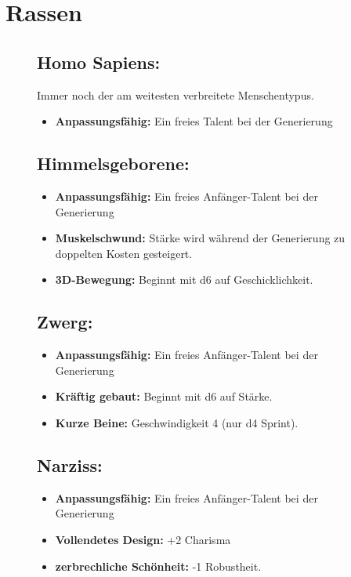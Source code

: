 \documentclass[10pt,a4paper]{report}
\begin{document}
\section{Rassen}
\begin{figure}[h!]
\subsection*{Homo Sapiens:} Immer noch der am weitesten verbreitete Menschentypus.
\begin{itemize}
\item \textbf{Anpassungsfähig:} Ein freies Talent bei der Generierung
\end{itemize}
\end{figure}

\begin{figure}[h!]
\subsection*{Himmelsgeborene:}
\begin{itemize}
\item \textbf{Anpassungsfähig:} Ein freies Anfänger-Talent bei der Generierung
\item \textbf{Muskelschwund:} Stärke wird während der Generierung zu doppelten Kosten gesteigert.
\item \textbf{3D-Bewegung:} Beginnt mit d6 auf Geschicklichkeit.
\end{itemize}
\end{figure}

\begin{figure}[h!]
\subsection*{Zwerg:}
\begin{itemize}
\item \textbf{Anpassungsfähig:} Ein freies Anfänger-Talent bei der Generierung
\item \textbf{Kräftig gebaut:} Beginnt mit d6 auf Stärke.
\item \textbf{Kurze Beine:} Geschwindigkeit 4 (nur d4 Sprint).
\end{itemize}
\end{figure}

\begin{figure}[h!]
\subsection*{Narziss:}
\begin{itemize}
\item \textbf{Anpassungsfähig:} Ein freies Anfänger-Talent bei der Generierung
\item \textbf{Vollendetes Design:} +2 Charisma
\item \textbf{zerbrechliche Schönheit:} -1 Robustheit.
\end{itemize}
\end{figure}
\end{document}

